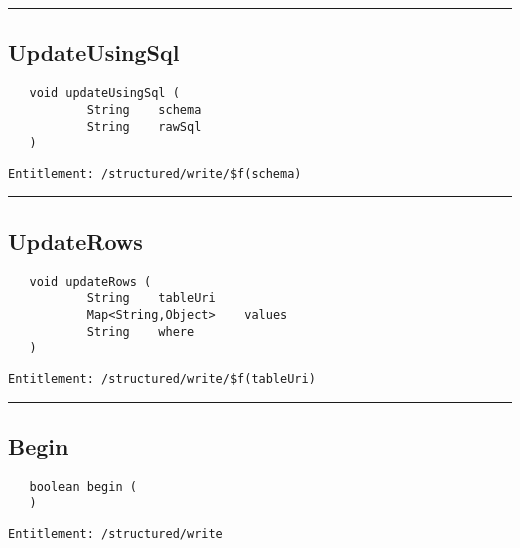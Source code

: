 \rule{12cm}{2pt}
\subsection{UpdateUsingSql}
\label{Api:UpdateUsingSql}
\begin{verbatim}
   void updateUsingSql (
           String    schema
           String    rawSql
   )
\end{verbatim}
\begin{Verbatim}[fontsize=\small, formatcom=\color{Maroon}]
  Entitlement: /structured/write/$f(schema)
\end{Verbatim}



\rule{12cm}{2pt}
\subsection{UpdateRows}
\label{Api:UpdateRows}
\begin{verbatim}
   void updateRows (
           String    tableUri
           Map<String,Object>    values
           String    where
   )
\end{verbatim}
\begin{Verbatim}[fontsize=\small, formatcom=\color{Maroon}]
  Entitlement: /structured/write/$f(tableUri)
\end{Verbatim}



\rule{12cm}{2pt}
\subsection{Begin}
\label{Api:Begin}
\begin{verbatim}
   boolean begin (
   )
\end{verbatim}
\begin{Verbatim}[fontsize=\small, formatcom=\color{Maroon}]
  Entitlement: /structured/write
\end{Verbatim}




